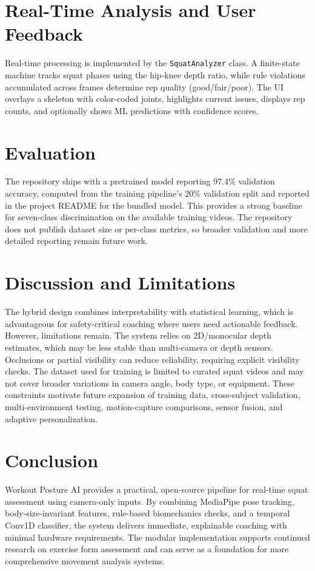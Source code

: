 \documentclass[11pt]{article}
\begin{document}
\section{Real-Time Analysis and User Feedback}
Real-time processing is implemented by the \texttt{SquatAnalyzer} class. A finite-state machine tracks squat phases using the hip-knee depth ratio, while rule violations accumulated across frames determine rep quality (good/fair/poor). The UI overlays a skeleton with color-coded joints, highlights current issues, displays rep counts, and optionally shows ML predictions with confidence scores.

\section{Evaluation}
The repository ships with a pretrained model reporting 97.4\% validation accuracy, computed from the training pipeline's 20\% validation split and reported in the project README for the bundled model. This provides a strong baseline for seven-class discrimination on the available training videos. The repository does not publish dataset size or per-class metrics, so broader validation and more detailed reporting remain future work.

\section{Discussion and Limitations}
The hybrid design combines interpretability with statistical learning, which is advantageous for safety-critical coaching where users need actionable feedback. However, limitations remain. The system relies on 2D/monocular depth estimates, which may be less stable than multi-camera or depth sensors. Occlusions or partial visibility can reduce reliability, requiring explicit visibility checks. The dataset used for training is limited to curated squat videos and may not cover broader variations in camera angle, body type, or equipment. These constraints motivate future expansion of training data, cross-subject validation, multi-environment testing, motion-capture comparisons, sensor fusion, and adaptive personalization.

\section{Conclusion}
Workout Posture AI provides a practical, open-source pipeline for real-time squat assessment using camera-only inputs. By combining MediaPipe pose tracking, body-size-invariant features, rule-based biomechanics checks, and a temporal Conv1D classifier, the system delivers immediate, explainable coaching with minimal hardware requirements. The modular implementation supports continued research on exercise form assessment and can serve as a foundation for more comprehensive movement analysis systems.
\end{document}

